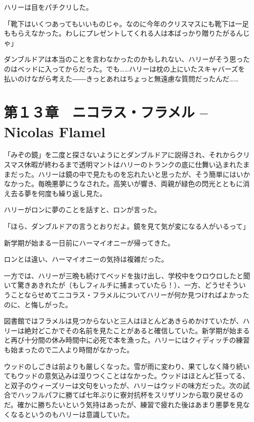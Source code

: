 \documentclass[10pt,a4paper]{article}
\begin{document}
\begin{CJK}{UTF8}{min}
ハリーは目をパチクリした。

「靴下はいくつあってもいいものじゃ。なのに今年のクリスマスにも靴下は一足ももらえなかった。わしにプレゼントしてくれる人は本ばっかり贈りたがるんじゃ」

ダンブルドアは本当のことを言わなかったのかもしれない、ハリーがそう思ったのはベッドに入ってからだった。でも……ハリーは枕の上にいたスキャバーズを払いのけながら考えた――きっとあれはちょっと無遠慮な質問だったんだ……




\section{第１３章　ニコラス・フラメル -- Nicolas Flamel}





「みぞの鏡」を二度と探さないようにとダンブルドアに説得され、それからクリスマス休暇が終わるまで透明マントはハリーのトランクの底に仕舞い込まれたままだった。ハリーは鏡の中で見たものを忘れたいと思ったが、そう簡単にはいかなかった。毎晩悪夢にうなされた。高笑いが響き、両親が緑色の閃光とともに消え去る夢を何度も繰り返し見た。

ハリーがロンに夢のことを話すと、ロンが言った。

「ほら、ダンブルドアの言うとおりだよ。鏡を見て気が変になる人がいるって」

新学期が始まる一日前にハーマイオニーが帰ってきた。

ロンとは違い、ハーマイオニーの気持は複雑だった。

一方では、ハリーが三晩も続けてベッドを抜け出し、学校中をウロウロしたと聞いて驚きあきれたが（もしフィルチに捕まっていたら！）、一方、どうせそういうことならせめてニコラス・フラメルについてハリーが何か見つければよかったのに、と悔しがった。

図書館ではフラメルは見つからないと三人はほとんどあきらめかけていたが、ハリーは絶対どこかでその名前を見たことがあると確信していた。新学期が始まると再び十分間の休み時間中に必死で本を漁った。ハリーにはクィディッチの練習も始まったので二人より時間がなかった。

ウッドのしごきは前よりも厳しくなった。雪が雨に変わり、果てしなく降り続いてもウッドの意気込みは湿りつくことはなかった。ウッドはほとんど狂ってる、と双子のウィーズリーは文句をいったが、ハリーはウッドの味方だった。次の試合でハッフルパフに勝てば七年ぶりに寮対抗杯をスリザリンから取り戻せるのだ。確かに勝ちたいという気持はあったが、練習で疲れた後はあまり悪夢を見なくなるというのもハリーは意識していた。


\end{CJK}
\end{document}
